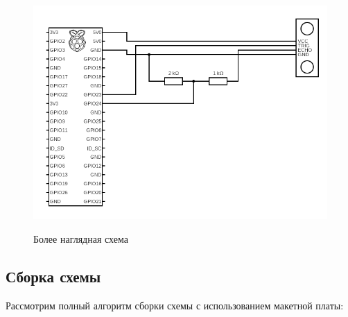 \documentclass[a4paper, 14pt]{article}
\begin{document}
\begin{figure}[H]
	\centering
	\includegraphics[width=12cm]{screenshots/5.png}\\
	\caption{Более наглядная схема}
\end{figure}

\subsection{Сборка схемы}

Рассмотрим полный алгоритм сборки схемы с использованием макетной платы:
\end{document}
